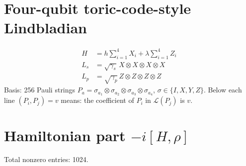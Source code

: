 \documentclass{article}
\begin{document}
\section*{Four-qubit toric-code-style Lindbladian}
\begin{align*}
  H   &= h \sum_{i=1}^{4} X_i + \lambda \sum_{i=1}^{4} Z_i \\
  L_s &= \sqrt{\gamma_s}\, X\otimes X\otimes X\otimes X \\
  L_p &= \sqrt{\gamma_p}\, Z\otimes Z\otimes Z\otimes Z
\end{align*}
Basis: 256 Pauli strings $P_a = \sigma_{a_1}\otimes\sigma_{a_2}\otimes\sigma_{a_3}\otimes\sigma_{a_4}$, $\sigma \in \{I, X, Y, Z\}$.  Below each line $(P_i, P_j) = v$ means: the coefficient of $P_i$ in $\mathcal{L}(P_j)$ is $v$.

\section*{Hamiltonian part $-i[H,\rho]$}
Total nonzero entries: 1024.
\end{document}
